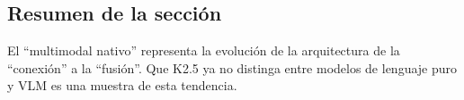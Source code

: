 \subsection{Resumen de la sección}

El ``multimodal nativo'' representa la evolución de la arquitectura de la ``conexión'' a la ``fusión''. Que K2.5 ya no distinga entre modelos de lenguaje puro y VLM es una muestra de esta tendencia.

